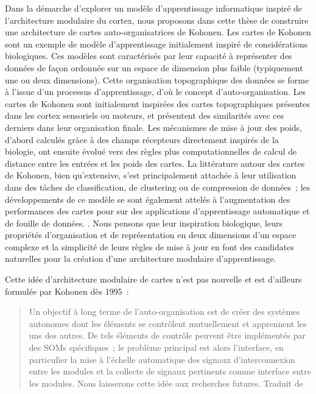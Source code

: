 Dans la démarche d'explorer un modèle d'apprentissage informatique inspiré de l'architecture modulaire du cortex, nous proposons dans cette thèse de construire une architecture de cartes auto-organisatrices de Kohonen.
Les cartes de Kohonen \parencite{Kohonen1982} sont un exemple de modèle d'apprentissage initialement inspiré de considérations biologiques.
Ces modèles sont caractérisés par leur capacité à représenter des données de façon ordonnée sur un espace de dimension plus faible (typiquement une ou deux dimensions). Cette organisation topographique des données se forme à l'issue d'un processus d'apprentissage, d'où le concept d'auto-organisation.
Les cartes de Kohonen sont initialement inspirées des cartes topographiques présentes dans les cortex sensoriels ou moteurs, et présentent des similarités avec ces derniers dans leur organisation finale.
Les mécanismes de mise à jour des poids, d'abord calculés grâce à des champs récepteurs directement inspirés de la biologie, ont ensuite évolué vers des règles plus computationnelles de calcul de distance entre les entrées et les poids des cartes.
La littérature autour des cartes de Kohonen, bien qu'extensive, s'est principalement attachée à leur utilisation dans des tâches de classification, de clustering ou de compression de données~; les développements de ce modèle se sont également attelés à l'augmentation des performances des cartes pour sur des applications d'apprentissage automatique et de fouille de données. \cite{kohonen_essentials_2013}.
Nous pensons que leur inspiration biologique, leurs propriétés d'organisation et de représentation en deux dimensions d'un espace complexe et la simplicité de leurs règles de mise à jour en font des candidates naturelles pour la création d'une architecture modulaire d'apprentissage.

Cette idée d'architecture modulaire de cartes n'est pas nouvelle et est d'ailleurs formulée par Kohonen dès 1995~:
\begin{quote}
Un objectif à long terme de l'auto-organisation est de créer des systèmes autonomes dont les éléments se contrôlent mutuellement et apprennent les uns des autres. De tels éléments de contrôle peuvent être implémentés par des SOMs spécifiques~; le problème principal est alors l'interface, en particulier la mise à l'échelle automatique des signaux d'interconnexion entre les modules et la collecte de signaux pertinents comme interface entre les modules. Nous laisserons cette idée aux recherches futures.
Traduit de \cite{Kohonen1995SelfOrganizingM}
\end{quote}

